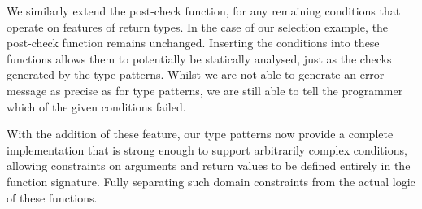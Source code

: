 \noindent
We similarly extend the post-check function, for any remaining conditions that operate on features of return types.
In the case of our selection example, the post-check function remains unchanged.
Inserting the conditions into these functions allows them to potentially be statically analysed, just as the checks generated by the type patterns.
Whilst we are not able to generate an error message as precise as for type patterns, we are still able to tell the programmer which of the given conditions failed.

With the addition of these feature, our type patterns now provide a complete implementation that is strong enough to support arbitrarily complex conditions, allowing constraints on arguments and return values to be defined entirely in the function signature.
Fully separating such domain constraints from the actual logic of these functions.

